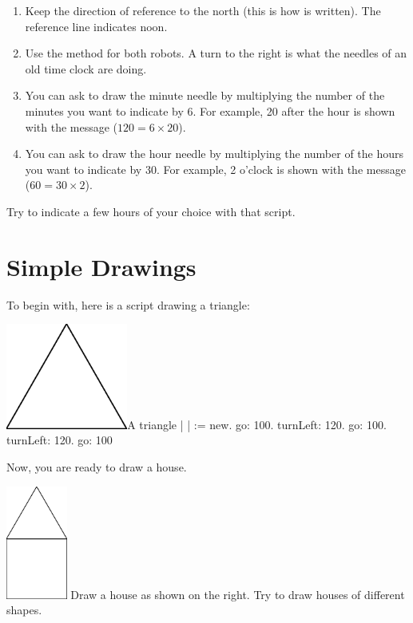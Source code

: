 \begin{enumerate}
\item Keep the direction of reference to the north (this is how
 is written). The reference line
indicates noon.
  
\item Use the method \turnRight for both robots. A turn
 to the right is what the needles of an old time clock are doing.
  
\item You can ask \caro to draw the minute needle by
multiplying the number of the minutes you want to indicate by 6.
For example, 20 after the hour is shown with the message 
 ($120 = 6 \times 20$).
  
\item You can ask  to draw the hour needle by
multiplying the number of the hours you want to indicate by 30.
For example, 2 o'clock is shown with the message
 ($60 = 30 \times 2$).
\end{enumerate}

Try to indicate a few hours of your choice with that script.

\section{Simple Drawings}\label{sec:angleExperiments} 
To begin with, here is a script drawing a triangle:

\begin{scriptfigwithsize}[0.4]{\includegraphics[width=4cm]{ChTurnfirstTriangle}}{A triangle} \label{scr:firstTriangle}
| \caro |
\caro := \Turtle new.
\caro go: 100.
\caro turnLeft: 120.
\caro go: 100.
\caro turnLeft: 120.
\caro go: 100
\end{scriptfigwithsize}

Now, you are ready to draw a house.

\begin{exofigwithsize}{\includegraphics[width=2cm]{ChTurnbabyHouse}}\label{exo:babyHouse} 
Draw a house as shown on the right. Try to draw houses of different shapes.
\end{exofigwithsize}

